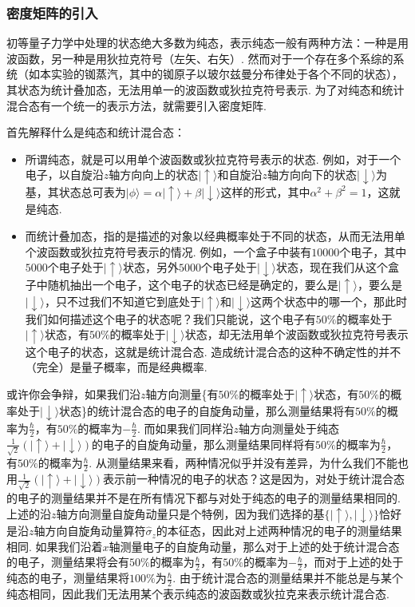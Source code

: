 \documentclass{assignment}
\begin{document}
\subsubsection{密度矩阵的引入}
初等量子力学中处理的状态绝大多数为纯态，表示纯态一般有两种方法：一种是用波函数，另一种是用狄拉克符号（左矢、右矢）. 然而对于一个存在多个系综的系统（如本实验的铷蒸汽，其中的铷原子以玻尔兹曼分布律处于各个不同的状态），其状态为统计叠加态，无法用单一的波函数或狄拉克符号表示. 为了对纯态和统计混合态有一个统一的表示方法，就需要引入密度矩阵.

首先解释什么是纯态和统计混合态：
\begin{itemize}
    \item 所谓纯态，就是可以用单个波函数或狄拉克符号表示的状态. 例如，对于一个电子，以自旋沿$z$轴方向向上的状态$\lvert\uparrow\rangle$和自旋沿$z$轴方向向下的状态$\lvert\downarrow\rangle$为基，其状态总可表为$\lvert\phi\rangle=\alpha\lvert\uparrow\rangle+\beta\lvert\downarrow\rangle$这样的形式，其中$\alpha^2+\beta^2=1$，这就是纯态.
    \item 而统计叠加态，指的是描述的对象以经典概率处于不同的状态，从而无法用单个波函数或狄拉克符号表示的情况. 例如，一个盒子中装有$10000$个电子，其中$5000$个电子处于$\lvert\uparrow\rangle$状态，另外$5000$个电子处于$\lvert\downarrow\rangle$状态，现在我们从这个盒子中随机抽出一个电子，这个电子的状态已经是确定的，要么是$\lvert\uparrow\rangle$，要么是$\lvert\downarrow\rangle$，只不过我们不知道它到底处于$\lvert\uparrow\rangle$和$\lvert\downarrow\rangle$这两个状态中的哪一个，那此时我们如何描述这个电子的状态呢？我们只能说，这个电子有$50\%$的概率处于$\lvert\uparrow\rangle$状态，有$50\%$的概率处于$\lvert\downarrow\rangle$状态，却无法用单个波函数或狄拉克符号表示这个电子的状态，这就是统计混合态. 造成统计混合态的这种不确定性的并不（完全）是量子概率，而是经典概率.
\end{itemize}

或许你会争辩，如果我们沿$z$轴方向测量\{有$50\%$的概率处于$\lvert\uparrow\rangle$状态，有$50\%$的概率处于$\lvert\downarrow\rangle$状态\}的统计混合态的电子的自旋角动量，那么测量结果将有$50\%$的概率为$\frac{\hbar}{2}$，有$50\%$的概率为$-\frac{\hbar}{2}$. 而如果我们同样沿$z$轴方向测量处于纯态$\frac{1}{\sqrt{2}}(\lvert\uparrow\rangle+\lvert\downarrow\rangle)$的电子的自旋角动量，那么测量结果同样将有$50\%$的概率为$\frac{\hbar}{2}$，有$50\%$的概率为$\frac{\hbar}{2}$. 从测量结果来看，两种情况似乎并没有差异，为什么我们不能也用$\frac{1}{\sqrt{2}}(\lvert\uparrow\rangle+\lvert\downarrow\rangle)$表示前一种情况的电子的状态？这是因为，对处于统计混合态的电子的测量结果并不是在所有情况下都与对处于纯态的电子的测量结果相同的. 上述的沿$z$轴方向测量自旋角动量只是个特例，因为我们选择的基$\{\lvert\uparrow\rangle,\lvert\downarrow\rangle\}$恰好是沿$z$轴方向自旋角动量算符$\hat{\sigma}_z$的本征态，因此对上述两种情况的电子的测量结果相同. 如果我们沿着$x$轴测量电子的自旋角动量，那么对于上述的处于统计混合态的电子，测量结果将会有$50\%$的概率为$\frac{\hbar}{2}$，有$50\%$的概率为$-\frac{\hbar}{2}$，而对于上述的处于纯态的电子，测量结果将$100\%$为$\frac{\hbar}{2}$. 由于统计混合态的测量结果并不能总是与某个纯态相同，因此我们无法用某个表示纯态的波函数或狄拉克来表示统计混合态.
\end{document}
